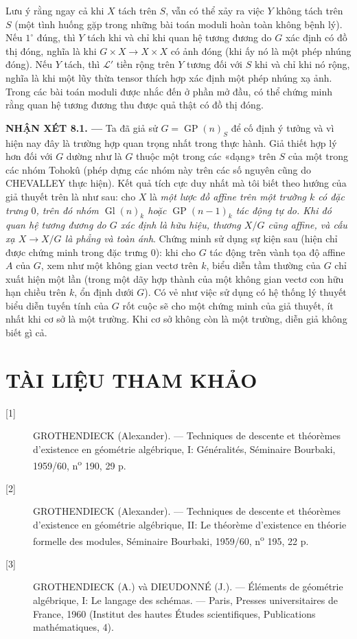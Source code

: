 Lưu ý rằng ngay cả khi $X$ tách trên $S$, vẫn có thể xảy ra việc $Y$ không
tách trên $S$ (một tình huống gặp trong những bài toán moduli hoàn toàn không
bệnh lý). Nếu $1^\circ$ đúng, thì $Y$ tách khi và chỉ khi quan hệ tương đương
do $G$ xác định có đồ thị đóng, nghĩa là khi $G\times X\to X\times X$ có ảnh
đóng (khi ấy nó là một phép nhúng đóng). Nếu $Y$ tách, thì $\mathcal L'$ tiền
rộng trên $Y$ tương đối với $S$ khi và chỉ khi nó rộng, nghĩa là khi một lũy
thừa tensor thích hợp xác định một phép nhúng xạ ảnh. Trong các bài toán moduli
được nhắc đến ở phần mở đầu, có thể chứng minh rằng quan hệ tương đương thu
được quả thật có đồ thị đóng.

\medskip
\noindent\textbf{NHẬN XÉT 8.1. ---} Ta đã giả sử
$G=\operatorname{GP}(n)_S$ để cố định ý tưởng và vì hiện nay đây là trường hợp
quan trọng nhất trong thực hành. Giả thiết hợp lý hơn đối với $G$ dường như là
$G$ thuộc một trong các «dạng» trên $S$ của một trong các nhóm Tohokû (phép
dựng các nhóm này trên các số nguyên cũng do CHEVALLEY thực hiện). Kết quả tích
cực duy nhất mà tôi biết theo hướng của giả thuyết trên là như sau: cho $X$ là
\emph{một lược đồ affine trên một trường $k$ có đặc trưng $0$, trên đó nhóm
$\operatorname{Gl}(n)_k$ hoặc $\operatorname{GP}(n-1)_k$ tác động tự do. Khi
đó quan hệ tương đương do $G$ xác định là hữu hiệu, thương $X/G$ cũng affine,
và cấu xạ $X\to X/G$ là phẳng và toàn ánh}. Chứng minh sử dụng sự kiện sau
(hiện chỉ được chứng minh trong đặc trưng $0$): khi cho $G$ tác động trên vành
tọa độ affine $A$ của $G$, xem như một không gian vectơ trên $k$, biểu diễn tầm
thường của $G$ chỉ xuất hiện một lần (trong một dãy hợp thành của một không
gian vectơ con hữu hạn chiều trên $k$, ổn định dưới $G$). Có vẻ như việc sử
dụng có hệ thống
lý thuyết biểu diễn tuyến tính của $G$ rốt cuộc sẽ cho một chứng minh của
giả thuyết, ít nhất khi cơ sở là một trường. Khi cơ sở không còn là một trường,
diễn giả không biết gì cả.

\section*{TÀI LIỆU THAM KHẢO}

\begin{description}
\item[{[1]}] GROTHENDIECK (Alexander). --- Techniques de descente et théorèmes
d'existence en géométrie algébrique, I: Généralités, Séminaire Bourbaki,
1959/60, n\textsuperscript{o} 190, 29 p.

\item[{[2]}] GROTHENDIECK (Alexander). --- Techniques de descente et théorèmes
d'existence en géométrie algébrique, II: Le théorème d'existence en théorie
formelle des modules, Séminaire Bourbaki, 1959/60,
n\textsuperscript{o} 195, 22 p.

\item[{[3]}] GROTHENDIECK (A.) và DIEUDONNÉ (J.). --- Éléments de géométrie
algébrique, I: Le langage des schémas. --- Paris, Presses universitaires de
France, 1960 (Institut des hautes Études scientifiques, Publications
mathématiques, 4).
\end{description}
